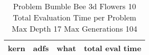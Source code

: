 \begin{table}[H]
\caption{Problem  Bumble Bee 3d  Flowers 10\\Total Evaluation Time per Problem \\ Max Depth 17 Max Generations 104\\}
\begin{center}
\scalebox{1.0} %
{
\begin{tabular}{lllr}
\hline
kern & adfs & what & total eval time \\
\hline


\end{tabular}
}
\end{center}
\end{table}

